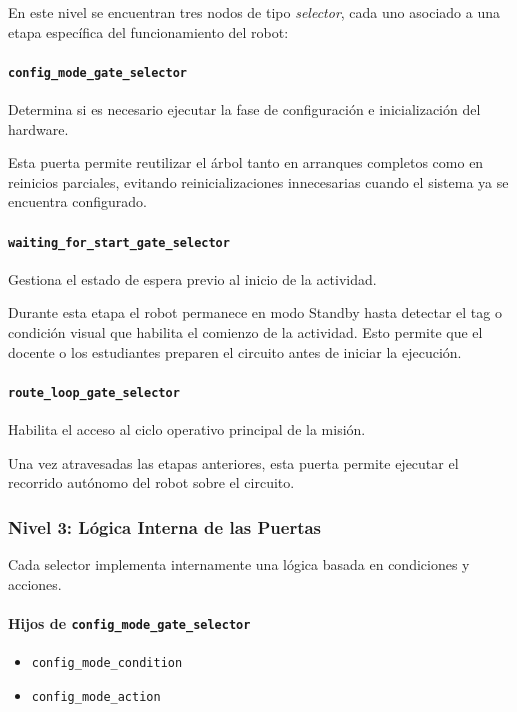 \documentclass{prgrado}
\begin{document}
En este nivel se encuentran tres nodos de tipo \textit{selector}, cada uno asociado a una etapa específica del funcionamiento del robot:

\paragraph{\texttt{config\_mode\_gate\_selector}}

Determina si es necesario ejecutar la fase de configuración e inicialización del hardware.

Esta puerta permite reutilizar el árbol tanto en arranques completos como en reinicios parciales, evitando reinicializaciones innecesarias cuando el sistema ya se encuentra configurado.

\paragraph{\texttt{waiting\_for\_start\_gate\_selector}}

Gestiona el estado de espera previo al inicio de la actividad.

Durante esta etapa el robot permanece en modo Standby hasta detectar el tag o condición visual que habilita el comienzo de la actividad. Esto permite que el docente o los estudiantes preparen el circuito antes de iniciar la ejecución.

\paragraph{\texttt{route\_loop\_gate\_selector}}

Habilita el acceso al ciclo operativo principal de la misión.

Una vez atravesadas las etapas anteriores, esta puerta permite ejecutar el recorrido autónomo del robot sobre el circuito.

\subsubsection{Nivel 3: Lógica Interna de las Puertas}

Cada selector implementa internamente una lógica basada en condiciones y acciones.

\paragraph{Hijos de \texttt{config\_mode\_gate\_selector}}

\begin{itemize}
    \item \texttt{config\_mode\_condition}
    \item \texttt{config\_mode\_action}
\end{itemize}
\end{document}
